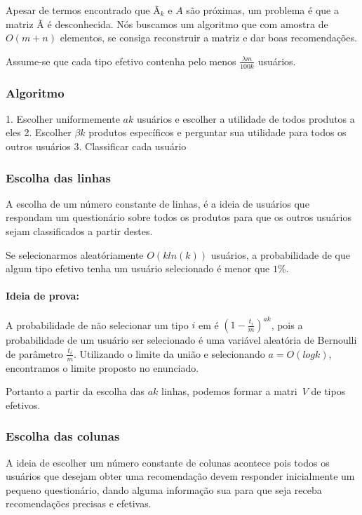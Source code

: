 \documentclass[a4paper,10pt]{article}
\begin{document}
Apesar de termos encontrado que Ã$_k$ e $A$ são próximas, um problema é que a matriz Ã é desconhecida. Nós buscamos um algoritmo que com amostra de $O(m+n)$ elementos, se consiga reconstruir a matriz e dar boas recomendações. 

Assume-se que cada tipo efetivo contenha pelo menos $\frac{\lambda m}{100k}$ usuários.

\subsubsection{Algoritmo}

1. Escolher uniformemente $ak$ usuários e escolher a utilidade de todos produtos a eles
2. Escolher $\beta k$ produtos específicos e perguntar sua utilidade para todos os outros usuários
3. Classificar cada usuário


\subsubsection{Escolha das linhas}

A escolha de um número constante de linhas, é a ideia de usuários que respondam um questionário sobre todos os produtos para que os outros usuários sejam
classificados a partir destes. 

\begin{lema}
 Se selecionarmos aleatóriamente $O(k ln (k) )$ usuários, a probabilidade de que algum tipo efetivo tenha um usuário selecionado é menor que $1\%$.
\end{lema}

\paragraph{Ideia de prova:} 
A probabilidade de não selecionar um tipo $i$ em é $(1 - \frac{t_i}{m})^{ak}$, pois a probabilidade de um usuário ser selecionado é uma variável
aleatória de Bernoulli de parâmetro $\frac{t_i}{m}$. Utilizando o limite da união e selecionando $a = O(log k)$, encontramos o limite proposto no enunciado.


Portanto a partir da escolha das $ak$ linhas, podemos formar a matri\ $V$ de tipos efetivos.

\subsubsection{Escolha das colunas}

A ideia de escolher um número constante de colunas acontece pois todos os usuários que desejam obter uma recomendação devem responder inicialmente um pequeno 
questionário, dando alguma informação sua para que seja receba recomendações precisas e efetivas.
\end{document}
